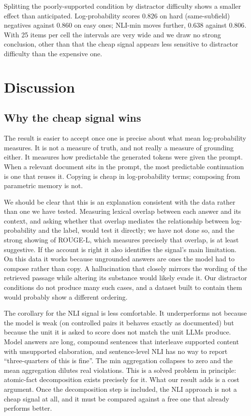 \documentclass[11pt,a4paper]{article}
\begin{document}
Splitting the poorly-supported condition by distractor difficulty shows a
smaller effect than anticipated. Log-probability scores $0.826$ on hard
(same-subfield) negatives against $0.860$ on easy ones; NLI-min moves further,
$0.638$ against $0.806$. With 25 items per cell the intervals are very wide and
we draw no strong conclusion, other than that the cheap signal appears less
sensitive to distractor difficulty than the expensive one.

\section{Discussion}
\label{sec:discussion}

\subsection{Why the cheap signal wins}

The result is easier to accept once one is precise about what mean
log-probability measures. It is not a measure of truth, and not really a measure
of grounding either. It measures how predictable the generated tokens were given
the prompt. When a relevant document sits in the prompt, the most
predictable continuation is one that reuses it. Copying is cheap in
log-probability terms; composing from parametric memory is not.

We should be clear that this is an explanation consistent with the data rather
than one we have tested. Measuring lexical overlap between each answer and its
context, and asking whether that overlap mediates the relationship between
log-probability and the label, would test it directly; we have not done so, and
the strong showing of ROUGE-L, which measures precisely that overlap, is at
least suggestive. If the account is right it also identifies the signal's main
limitation. On this data it works because ungrounded answers are ones the model
had to compose rather than copy. A hallucination that closely mirrors the
wording of the retrieved passage while altering its substance would likely evade
it. Our distractor conditions do not produce many such cases, and a dataset
built to contain them would probably show a different ordering.

The corollary for the NLI signal is less comfortable. It underperforms not
because the model is weak (on controlled pairs it behaves exactly as
documented) but because the unit it is asked to score does not match the unit
LLMs produce. Model answers are long, compound sentences that interleave
supported content with unsupported elaboration, and sentence-level NLI has no
way to report ``three-quarters of this is fine''. The min aggregation collapses
to zero and the mean aggregation dilutes real violations. This is a solved
problem in principle: atomic-fact decomposition \cite{min2023factscore} exists
precisely for it. What our result adds is a cost argument. Once the
decomposition step is included, the NLI approach is not a cheap signal at all,
and it must be compared against a free one that already performs better.
\end{document}
